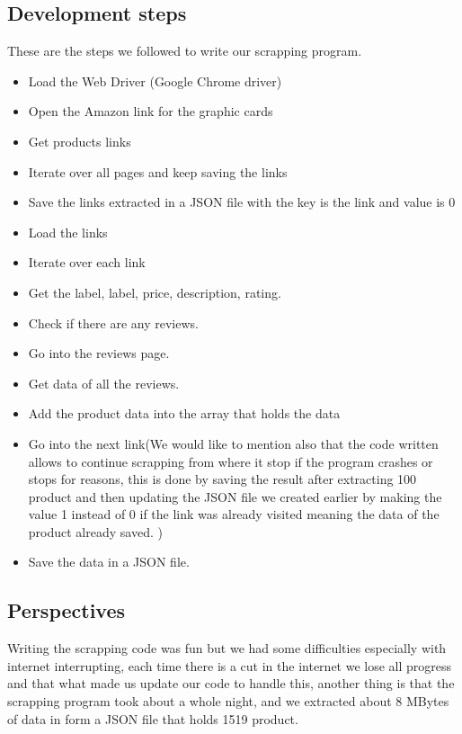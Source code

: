 \subsection{Development steps}
These are the steps we followed to write our scrapping program.
\begin{itemize}
    \item Load the Web Driver (Google Chrome driver)
    \item Open the Amazon link for the graphic cards
    \item Get products links
    \item Iterate over all pages and keep saving the links
    \item Save the links extracted in a JSON file with the key is the link and value is 0
    \item Load the links
    \item Iterate over each link
    \item Get the label, label, price, description, rating.
    \item Check if there are any reviews.
    \item Go into the reviews page.
    \item Get data of all the reviews.
    \item Add the product data into the array that holds the data
    \item Go into the next link(We would like to mention also that the code written allows to continue scrapping from where it stop if the program crashes or stops for reasons, this is done by saving the result after extracting 100 product and then updating the JSON file we created earlier by making the value 1 instead of 0 if the link was already visited meaning the data of the product already saved. )
    \item Save the data in a JSON file.
\end{itemize}
\subsection{Perspectives}
Writing the scrapping code was fun but we had some difficulties especially with internet interrupting, each time there is a cut in the internet we lose all progress and that what made us update our code to handle this, another thing is that the scrapping program took about a whole night, and we extracted about 8 MBytes of data in form a JSON file that holds 1519 product.




